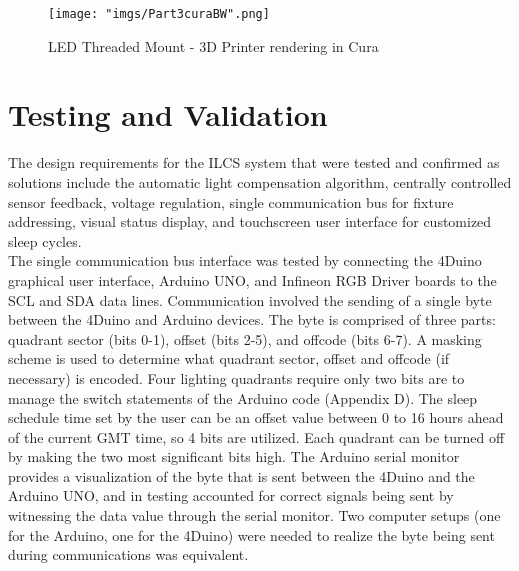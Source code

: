 \documentclass[12pt,a4paper]{report}
\begin{document}
\begin{figure}[H]
	\centering
	\texttt{[image: "imgs/Part3curaBW".png]}\par			\vspace{0.1cm}
	\caption{LED Threaded Mount - 3D Printer rendering in Cura}
\end{figure}

\section{Testing and Validation}
The design requirements for the ILCS system that were tested and confirmed as solutions include the automatic light compensation algorithm, centrally controlled sensor feedback, voltage regulation, single communication bus for fixture addressing, visual status display, and touchscreen user interface for customized sleep cycles. \\




The single communication bus interface was tested by connecting the 4Duino graphical user interface, Arduino UNO, and Infineon RGB Driver boards to the SCL and SDA data lines. Communication involved the sending of a single byte between the 4Duino and Arduino devices. The byte is comprised of three parts: quadrant sector (bits 0-1), offset (bits 2-5), and offcode (bits 6-7). A masking scheme is used to determine what quadrant sector, offset and offcode (if necessary) is encoded. Four lighting quadrants require only two bits are to manage the switch statements of the Arduino code (Appendix D). The sleep schedule time set by the user can be an offset value between 0 to 16 hours ahead of the current GMT time, so 4 bits are utilized. Each quadrant can be turned off by making the two most significant bits high. The Arduino serial monitor provides a visualization of the byte that is sent between the 4Duino and the Arduino UNO, and in testing accounted for correct signals being sent by witnessing the data value through the serial monitor. Two computer setups (one for the Arduino, one for the 4Duino) were needed to realize the byte being sent during communications was equivalent. \\
\end{document}
